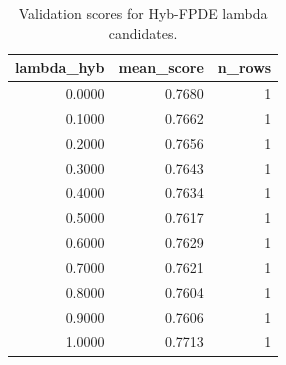 \begin{table}[t]
\caption{Validation scores for Hyb-FPDE lambda candidates.}
\label{tab:lambda_distribution_computed}
\centering
\begin{tabular}{rrr}
\toprule
lambda\_hyb & mean\_score & n\_rows \\
\midrule
0.0000 & 0.7680 & 1 \\
0.1000 & 0.7662 & 1 \\
0.2000 & 0.7656 & 1 \\
0.3000 & 0.7643 & 1 \\
0.4000 & 0.7634 & 1 \\
0.5000 & 0.7617 & 1 \\
0.6000 & 0.7629 & 1 \\
0.7000 & 0.7621 & 1 \\
0.8000 & 0.7604 & 1 \\
0.9000 & 0.7606 & 1 \\
1.0000 & 0.7713 & 1 \\
\bottomrule
\end{tabular}

\end{table}
